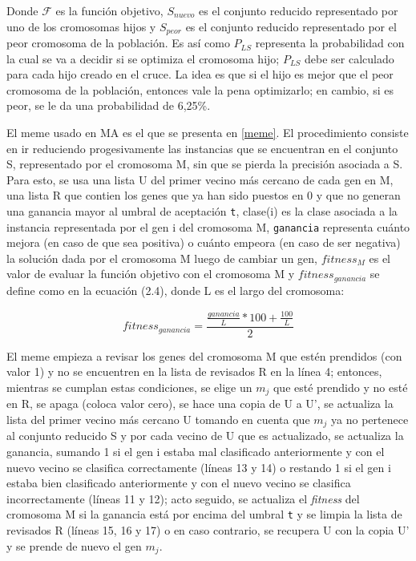 Donde $\mathcal{F}$ es la función objetivo, $S_{nuevo}$ es el conjunto reducido representado por uno de los cromosomas hijos y $S_{peor}$ es el conjunto reducido representado por el peor cromosoma de la población. Es así como $P_{LS}$ representa la probabilidad con la cual se va a decidir si se optimiza el cromosoma hijo; $P_{LS}$ debe ser calculado para cada hijo creado en el cruce. La idea es que si el hijo es mejor que el peor cromosoma de la población, entonces vale la pena optimizarlo; en cambio, si es peor, se le da una probabilidad de 6,25\%.

El meme usado en MA es el que se presenta en \ref{meme}. El procedimiento consiste en ir reduciendo progesivamente las instancias que se encuentran en el conjunto S, representado por el cromosoma M, sin que se pierda la precisión asociada a S. Para esto, se usa una lista U del primer vecino más cercano de cada gen en M, una lista R que contien los genes que ya han sido puestos en 0 y que no generan una ganancia mayor al umbral de aceptación \texttt{t}, clase(i) es la clase asociada a la instancia representada por el gen i del cromosoma M, \texttt{ganancia} representa cuánto mejora (en caso de que sea positiva) o cuánto empeora (en caso de ser negativa) la solución dada por el cromosoma M luego de cambiar un gen, $fitness_M$ es el valor de evaluar la función objetivo con el cromosoma M y $fitness_{ganancia}$ se define como en la ecuación (2.4), donde L es el largo del cromosoma:

\begin{equation}
fitness_{ganancia} = \frac{\frac{ganancia}{L}*100 + \frac{100}{L}}{2}
\end{equation}  

El meme empieza a revisar los genes del cromosoma M que estén prendidos (con valor 1) y no se encuentren en la lista de revisados R en la línea 4; entonces, mientras se cumplan estas condiciones, se elige un $m_j$ que esté prendido y no esté en R, se apaga (coloca valor cero), se hace una copia de U a U', se actualiza la lista del primer vecino más cercano U tomando en cuenta que $m_j$ ya no pertenece al conjunto reducido S y por cada vecino de U que es actualizado, se actualiza la ganancia, sumando 1 si el gen i estaba mal clasificado anteriormente y con el nuevo vecino se clasifica correctamente (líneas 13 y 14) o restando 1 si el gen i estaba bien clasificado anteriormente y con el nuevo vecino se clasifica incorrectamente (líneas 11 y 12); acto seguido, se actualiza el \emph{fitness} del cromosoma M si la ganancia está por encima del umbral \texttt{t} y se limpia la lista de revisados R (líneas 15, 16 y 17) o en caso contrario, se recupera U con la copia U' y se prende de nuevo el gen $m_j$.  
 
